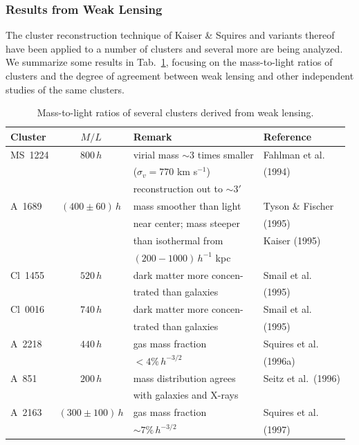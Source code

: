 \documentclass[a4paper,10pt]{article} %
\begin{document}
\subsubsection{Results from Weak Lensing}
\label{NB:subsubsect4.2.6}

The cluster reconstruction technique of Kaiser \& Squires and variants
thereof have been applied to a number of clusters and several more are
being analyzed. We summarize some results in Tab.\ \ref{NB:tab4.3},
focusing on the mass-to-light ratios of clusters and the degree of
agreement between weak lensing and other independent studies of the
same clusters.

\begin{table}
  \caption{Mass-to-light ratios of several clusters derived from weak
  lensing.}
\medskip %
  \begin{center}
  \begin{tabular}{|l|cll|}
  \hline\hline
    Cluster & $M/L$ & Remark & Reference \\
  \hline\hline
    MS~1224 & 8$00\,h$ & virial mass $\sim3$ times smaller &
    Fahlman et al.\ \\
    && ($\sigma_v=770$ km s$^{-1}$) & (1994) \\
    && reconstruction out to $\sim3'$ & \\
  \hline
    A~1689 & $(400\pm60)\,h$ & mass smoother than light &
    Tyson \& Fischer \\
    && near center; mass steeper & (1995) \\
    && than isothermal from & Kaiser (1995) \\
    && $(200-1000)\,h^{-1}$ kpc & \\
  \hline
    Cl~1455 & $520\,h$ & dark matter more concen- &
    Smail et al.\ \\
    && trated than galaxies & (1995) \\
  \hline
    Cl~0016 & $740\,h$ & dark matter more concen- &
    Smail et al.\ \\
    && trated than galaxies & (1995) \\
  \hline
    A~2218 & $440\,h$ & gas mass fraction &
    Squires et al.\ \\
    && $<4\%\,h^{-3/2}$ & (1996a) \\
  \hline
    A~851 & $200\,h$ & mass distribution agrees &
    Seitz et al.\ (1996) \\
    && with galaxies and X-rays & \\
  \hline
    A~2163 & $(300\pm100)\,h$ & gas mass fraction &
    Squires et al.\ \\
    && $\sim7\%\,h^{-3/2}$ & (1997) \\
  \hline\hline
  \end{tabular}
  \end{center}
\label{NB:tab4.3}
\end{table}
\end{document}
